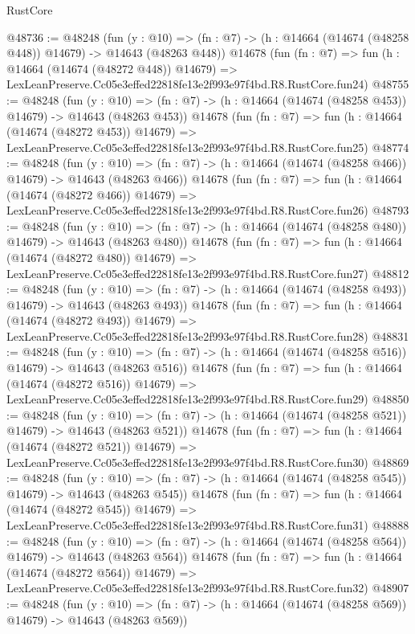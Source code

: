 \begin{lexlean}{RustCore}
\begin{coremodule}
@48736 := @48248
    (fun (y : @10) =>
    (fn : @7) -> (h : @14664 (@14674 (@48258 @448)) @14679) -> @14643 (@48263 @448))
    @14678
    (fun (fn : @7) =>
    fun (h : @14664 (@14674 (@48272 @448)) @14679) =>
    LexLeanPreserve.Cc05e3effed22818fe13e2f993e97f4bd.R8.RustCore.fun24)
@48755 := @48248
    (fun (y : @10) =>
    (fn : @7) -> (h : @14664 (@14674 (@48258 @453)) @14679) -> @14643 (@48263 @453))
    @14678
    (fun (fn : @7) =>
    fun (h : @14664 (@14674 (@48272 @453)) @14679) =>
    LexLeanPreserve.Cc05e3effed22818fe13e2f993e97f4bd.R8.RustCore.fun25)
@48774 := @48248
    (fun (y : @10) =>
    (fn : @7) -> (h : @14664 (@14674 (@48258 @466)) @14679) -> @14643 (@48263 @466))
    @14678
    (fun (fn : @7) =>
    fun (h : @14664 (@14674 (@48272 @466)) @14679) =>
    LexLeanPreserve.Cc05e3effed22818fe13e2f993e97f4bd.R8.RustCore.fun26)
@48793 := @48248
    (fun (y : @10) =>
    (fn : @7) -> (h : @14664 (@14674 (@48258 @480)) @14679) -> @14643 (@48263 @480))
    @14678
    (fun (fn : @7) =>
    fun (h : @14664 (@14674 (@48272 @480)) @14679) =>
    LexLeanPreserve.Cc05e3effed22818fe13e2f993e97f4bd.R8.RustCore.fun27)
@48812 := @48248
    (fun (y : @10) =>
    (fn : @7) -> (h : @14664 (@14674 (@48258 @493)) @14679) -> @14643 (@48263 @493))
    @14678
    (fun (fn : @7) =>
    fun (h : @14664 (@14674 (@48272 @493)) @14679) =>
    LexLeanPreserve.Cc05e3effed22818fe13e2f993e97f4bd.R8.RustCore.fun28)
@48831 := @48248
    (fun (y : @10) =>
    (fn : @7) -> (h : @14664 (@14674 (@48258 @516)) @14679) -> @14643 (@48263 @516))
    @14678
    (fun (fn : @7) =>
    fun (h : @14664 (@14674 (@48272 @516)) @14679) =>
    LexLeanPreserve.Cc05e3effed22818fe13e2f993e97f4bd.R8.RustCore.fun29)
@48850 := @48248
    (fun (y : @10) =>
    (fn : @7) -> (h : @14664 (@14674 (@48258 @521)) @14679) -> @14643 (@48263 @521))
    @14678
    (fun (fn : @7) =>
    fun (h : @14664 (@14674 (@48272 @521)) @14679) =>
    LexLeanPreserve.Cc05e3effed22818fe13e2f993e97f4bd.R8.RustCore.fun30)
@48869 := @48248
    (fun (y : @10) =>
    (fn : @7) -> (h : @14664 (@14674 (@48258 @545)) @14679) -> @14643 (@48263 @545))
    @14678
    (fun (fn : @7) =>
    fun (h : @14664 (@14674 (@48272 @545)) @14679) =>
    LexLeanPreserve.Cc05e3effed22818fe13e2f993e97f4bd.R8.RustCore.fun31)
@48888 := @48248
    (fun (y : @10) =>
    (fn : @7) -> (h : @14664 (@14674 (@48258 @564)) @14679) -> @14643 (@48263 @564))
    @14678
    (fun (fn : @7) =>
    fun (h : @14664 (@14674 (@48272 @564)) @14679) =>
    LexLeanPreserve.Cc05e3effed22818fe13e2f993e97f4bd.R8.RustCore.fun32)
@48907 := @48248
    (fun (y : @10) =>
    (fn : @7) -> (h : @14664 (@14674 (@48258 @569)) @14679) -> @14643 (@48263 @569))

\end{coremodule}
\end{lexlean}
